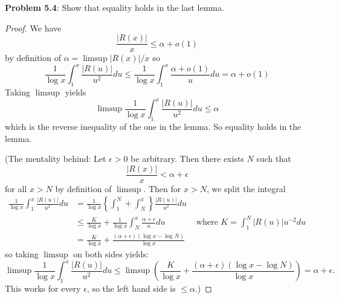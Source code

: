 \documentclass[12pt]{article}
\begin{document}
\fi

\textbf{Problem 5.4}: Show that equality holds in the last lemma.

\begin{proof}
We have
$$\frac{|R(x)|}{x} \leq \alpha + o(1)$$
by definition of $\alpha = \limsup |R(x)|/x$ so
$$\frac{1}{\log x} \int_1^x \frac{|R(u)|}{u^2} du \leq \frac{1}{\log x} \int_1^x \frac{\alpha + o(1)}{u} du = \alpha + o(1)$$
Taking $\limsup$ yields
$$\limsup \frac{1}{\log x} \int_1^x \frac{|R(u)|}{u^2} du \leq \alpha$$
which is the reverse inequality of the one in the lemma. So equality holds in the lemma.

(The mentality behind: Let $\epsilon > 0$ be arbitrary. Then there exists $N$ such that
$$\frac{|R(x)|}{x} < \alpha + \epsilon$$
for all $x > N$ by definition of $\limsup$. Then for $x > N$, we split the integral
\begin{align*}
\frac{1}{\log x} \int_1^x \frac{|R(u)|}{u^2} du &= \frac{1}{\log x} \left\{ \int_1^N + \int_N^x \right\} \frac{|R(u)|}{u^2} du\\
&\leq \frac{K}{\log x} + \frac{1}{\log x} \int_N^x \frac{\alpha + \epsilon}{u} du &\text{ where } K = \int_1^N |R(u)| u^{-2} du\\
&= \frac{K}{\log x} + \frac{(\alpha + \epsilon)(\log x - \log N)}{\log x}
\end{align*}
so taking $\limsup$ on both sides yields:
$$\limsup \frac{1}{\log x} \int_1^x \frac{|R(u)|}{u^2} du \leq \limsup \left( \frac{K}{\log x} + \frac{(\alpha + \epsilon)(\log x - \log N)}{\log x} \right) = \alpha + \epsilon.$$
This works for every $\epsilon$, so the left hand side is $\leq \alpha$.)
\end{proof}

\unless\ifdefined\IsMainDocument
\end{document}
